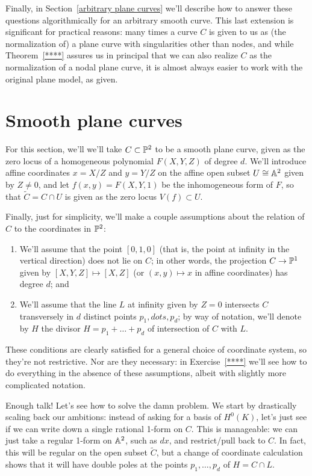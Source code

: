 Finally, in Section~\ref{arbitrary plane curves} we'll describe how to answer these questions algorithmically for an arbitrary smooth curve.
This last extension is significant for practical reasons: many times a curve $C$ is given to us as (the normalization of) a plane curve with singularities other than nodes, and while Theorem~\ref{****} assures us in principal that we can also realize $C$ as the normalization of a nodal plane curve, it is almost always easier to work with the original plane model, as given. 


\section{Smooth plane curves}\label{smooth plane curves}

For this section, we'll we'll take $C \subset \PP^2$ to be a smooth plane curve, given as the zero locus of a homogeneous polynomial $F(X,Y,Z)$ of degree $d$. We'll introduce affine coordinates $x = X/Z$ and $y = Y/Z$ on the affine open subset $U \cong \AA^2$ given by $Z \neq 0$, and let $f(x,y) = F(X,Y,1)$ be the inhomogeneous form of $F$, so that $\tilde C = C \cap U$ is given as the zero locus $V(f) \subset U$. 

Finally, just for simplicity, we'll make a couple assumptions about the relation of $C$ to the coordinates in $\PP^2$:
\begin{enumerate}
\item We'll assume that the point $[0,1,0]$ (that is, the point at infinity in the vertical direction) does not lie on $C$; in other words, the projection $C \to \PP^1$ given by $[X,Y,Z] \mapsto [X,Z]$ (or $(x,y) \mapsto x$ in affine coordinates)  has degree $d$; and
\item We'll assume that the line $L$ at infinity given by $Z = 0$ intersects $C$ transversely in $d$ distinct points $p_1, dots, p_d$; by way of notation, we'll denote by $H$ the divisor $H = p_1+ \dots +p_d$ of intersection of $C$ with $L$.
\end{enumerate}

These conditions are clearly satisfied for a general choice of coordinate system, so they're not restrictive. Nor are they necessary: in Exercise~\ref{****} we'll see how to do everything in the absence of these assumptions, albeit with slightly more complicated notation.
 
Enough talk! Let's see how to solve the damn problem. We start by drastically scaling back our ambitions: instead of asking for a basis of $H^0(K)$, let's just see if we can write down a single rational 1-form on $C$. This is manageable: we can just take a regular 1-form on $\AA^2$, such as $dx$, and restrict/pull back to $C$. In fact, this will be regular on the open subset $\tilde C$, but a change of coordinate calculation shows that it will have double poles at the points $p_1,\dots,p_d$ of $H = C \cap L$.
 
